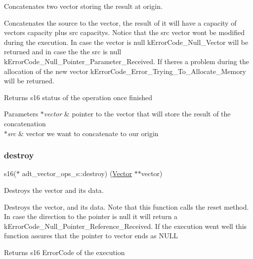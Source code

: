 Concatenates two vector storing the result at origin. 

Concatenates the source to the vector, the result of it will have a capacity of vector\textquotesingle{}s capacity plus src capacity\textquotesingle{}s. Notice that the src vector won\textquotesingle{}t be modified during the execution. In case the vector is null k\+Error\+Code\+\_\+\+Null\+\_\+\+Vector will be returned and in case the the src is null k\+Error\+Code\+\_\+\+Null\+\_\+\+Pointer\+\_\+\+Parameter\+\_\+\+Received. If there\textquotesingle{}s a problem during the allocation of the new vector k\+Error\+Code\+\_\+\+Error\+\_\+\+Trying\+\_\+\+To\+\_\+\+Allocate\+\_\+\+Memory will be returned.

\begin{DoxyReturn}{Returns}
s16 status of the operation once finished 
\end{DoxyReturn}

\begin{DoxyParams}{Parameters}
{\em $\ast$vector} & pointer to the vector that will store the result of the concatenation \\
\hline
{\em $\ast$src} & vector we want to concatenate to our origin \\
\hline
\end{DoxyParams}
\mbox{\label{structadt__vector__ops__s_a3e2175bbbc2c7b56de5b1b2a41ed9abc}} 
\subsubsection{\texorpdfstring{destroy}{destroy}}
{\footnotesize\ttfamily s16($\ast$ adt\+\_\+vector\+\_\+ops\+\_\+s\+::destroy) (\hyperlink{structadt__vector__s}{Vector} $\ast$$\ast$vector)}



Destroys the vector and it\textquotesingle{}s data. 

Destroys the vector, and its data. Note that this function calls the reset method. In case the direction to the pointer is null it will return a k\+Error\+Code\+\_\+\+Null\+\_\+\+Pointer\+\_\+\+Reference\+\_\+\+Received. If the execution went well this function assures that the pointer to vector ends as N\+U\+LL

\begin{DoxyReturn}{Returns}
s16 Error\+Code of the execution 
\end{DoxyReturn}


